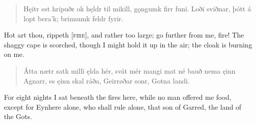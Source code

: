 \bookStart

\begin{verse}
\bva Hęitr est hripuðr \hld ok hęldr til mikill,
\ind gǫngumk firr funi.
Loði sviðnar, \hld þótt á lopt bera'k;
\ind brinnumk feldr fyrir. 
\end{verse}

\bvb Hot art thou, rippeth [\textsc{fire}], and rather too large; go further from me, fire! The shaggy cape is scorched, though I might hold it up in the air; the cloak is burning on me.

\begin{verse}
\bva Átta nætr satk \hld milli ęlda hér,
svát mér mangi \hld mat né bauð
nema ęinn Agnarr, \hld es ęinn skal ráða,
Geirrøðar sonr, \hld Gotna landi.
\end{verse}

\bvb For eight nights I sat beneath the fires here, while no man offered me food, except for Eynhere alone, who shall rule alone, that son of Garred, the land of the Gots.
